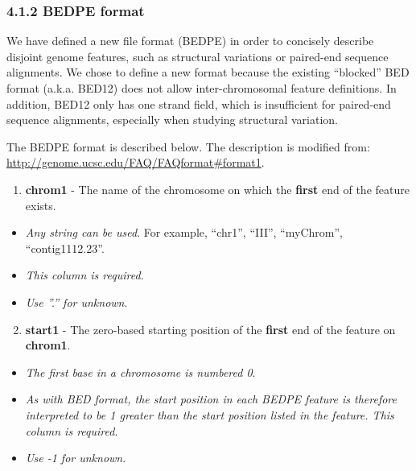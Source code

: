\documentclass[letterpaper,10pt,english]{sphinxmanual}
\begin{document}
\subsubsection{4.1.2 BEDPE format}
\label{content/general-usage:bedpe-format}
We have defined a new file format (BEDPE) in order to concisely describe disjoint genome features,
such as structural variations or paired-end sequence alignments. We chose to define a new format
because the existing ``blocked'' BED format (a.k.a. BED12) does not allow inter-chromosomal feature
definitions. In addition, BED12 only has one strand field, which is insufficient for paired-end sequence
alignments, especially when studying structural variation.

The BEDPE format is described below. The description is modified from: \href{http://genome.ucsc.edu/FAQ/FAQformat\#format1}{http://genome.ucsc.edu/FAQ/FAQformat\#format1}.
\begin{enumerate}
\item {} 
\textbf{chrom1} - The name of the chromosome on which the \textbf{first} end of the feature exists.

\end{enumerate}
\begin{itemize}
\item {} 
\emph{Any string can be used}. For example, ``chr1'', ``III'', ``myChrom'', ``contig1112.23''.

\item {} 
\emph{This column is required}.

\item {} 
\emph{Use ''.'' for unknown}.

\end{itemize}
\begin{enumerate}
\setcounter{enumi}{1}
\item {} 
\textbf{start1} - The zero-based starting position of the \textbf{first} end of the feature on \textbf{chrom1}.

\end{enumerate}
\begin{itemize}
\item {} 
\emph{The first base in a chromosome is numbered 0}.

\item {} 
\emph{As with BED format, the start position in each BEDPE feature is therefore interpreted to be 1 greater than the start position listed in the feature. This column is required}.

\item {} 
\emph{Use -1 for unknown}.

\end{itemize}
\end{document}

